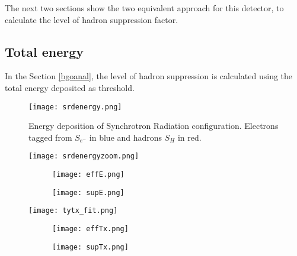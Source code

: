 The next two sections show the two equivalent approach for this detector, to calculate the level of hadron suppression
factor. 
\subsection{Total energy}
In the Section \ref{bgoanal}, the level of hadron suppression is calculated using the total energy deposited as
threshold. 


\begin{figure}[ht]
	\hspace*{\fill}
	\centering
	\texttt{[image: srdenergy.png]}
	\hspace*{\fill}
	\caption{Energy deposition of Synchrotron Radiation configuration. Electrons tagged from $S_{e^-}$ in blue and hadrons
	$S_H$ in red.}\label{srdenergy}
\end{figure}

\begin{figure}[ht]
	\hspace*{\fill}
	\centering
	\texttt{[image: srdenergyzoom.png]}
	\hspace*{\fill}
	\caption{}\label{}
\end{figure}

\begin{figure}[ht]
		\centering
		\hspace*{\fill}
		\begin{subfigure}[b]{0.48\textwidth}
			\centering
			\texttt{[image: effE.png]}
			\caption{}\label{}
		\end{subfigure}
		\hfill
		\begin{subfigure}[b]{0.48\textwidth}
			\centering
			\texttt{[image: supE.png]}
			\caption{}\label{}
		\end{subfigure}
		\hspace*{\fill}
		\caption{}\label{}
\end{figure}

\begin{figure}[ht]
	\hspace*{\fill}
	\centering
	\texttt{[image: tytx\_fit.png]}
	\hspace*{\fill}
	\caption{}\label{}
\end{figure}

\begin{figure}[ht]
		\centering
		\hspace*{\fill}
		\begin{subfigure}[b]{0.48\textwidth}
			\centering
			\texttt{[image: effTx.png]}
			\caption{}\label{}
		\end{subfigure}
		\hfill
		\begin{subfigure}[b]{0.48\textwidth}
			\centering
			\texttt{[image: supTx.png]}
			\caption{}\label{}
		\end{subfigure}
		\hspace*{\fill}
		\caption{}\label{}
\end{figure}

